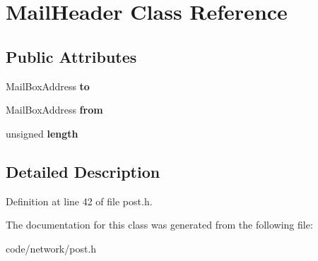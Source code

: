 \section{Mail\+Header Class Reference}
\label{class_mail_header}
\subsection*{Public Attributes}
\begin{DoxyCompactItemize}
\item 
Mail\+Box\+Address {\bfseries to}\label{class_mail_header_ae89eec1e19689892edbeed1a98782c3a}

\item 
Mail\+Box\+Address {\bfseries from}\label{class_mail_header_aecd770168405c941b31ff1baf390df79}

\item 
unsigned {\bfseries length}\label{class_mail_header_a58dab2045076ca8bdd8bb43f21025104}

\end{DoxyCompactItemize}


\subsection{Detailed Description}


Definition at line 42 of file post.\+h.



The documentation for this class was generated from the following file\+:\begin{DoxyCompactItemize}
\item 
code/network/post.\+h\end{DoxyCompactItemize}
